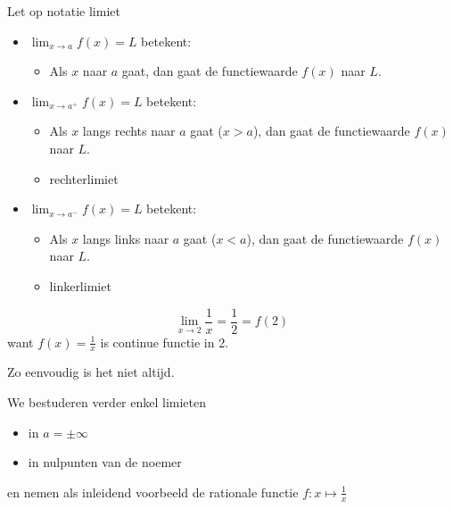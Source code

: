 \documentclass[handout]{beamer}
\begin{document}
\begin{frame}{Let op notatie limiet}

\begin{itemize}
\item $\displaystyle{\lim_{x \rightarrow a}} f(x) = L $ betekent: 
\begin{itemize}
	\item[] Als $x$
naar $a$ gaat, dan gaat de functiewaarde $f(x)$ naar $L$.
\end{itemize}

\item $\displaystyle{\lim_{x  \rightarrow a^+}} f(x) = L $ betekent: 
\begin{itemize}
	\item[] Als $x$ langs rechts
naar $a$ gaat ($x>a$), dan gaat de functiewaarde $f(x)$ naar $L$.
\item[] rechterlimiet
\end{itemize}

\item $\displaystyle{\lim_{x  \rightarrow a^-}} f(x) = L $ betekent:
\begin{itemize}
	\item[] Als $x$ langs links
naar $a$ gaat ($x<a$), dan gaat de functiewaarde $f(x)$ naar $L$.
\item[] linkerlimiet
\end{itemize}
 
\end{itemize}
\end{frame}

\begin{frame}

$$\displaystyle{\lim_{x \rightarrow 2}} \frac{1}{x} = \frac12 = f(2) $$
want $f(x)= \frac{1}{x}$ is continue functie in 2. 

Zo eenvoudig is het niet altijd.


We bestuderen verder enkel limieten 
\begin{itemize}
	\item in $a = \pm \infty$
	\item in nulpunten van de noemer
\end{itemize}
en nemen als inleidend voorbeeld de rationale functie $f : x \mapsto \frac 1x$
\end{frame}
\end{document}
